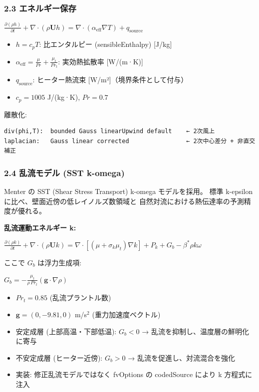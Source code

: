 \documentclass[a4paper,11pt]{article}
\begin{document}
\subsubsection{2.3 エネルギー保存}

$
\frac{\partial (\rho h)}{\partial t}
+ \nabla \cdot (\rho \mathbf{U} h) = \nabla \cdot (\alpha_{\text{eff}} \nabla T) + q_{\text{source}}
$

\begin{itemize} \item $h = c_p T$: 比エンタルピー (sensibleEnthalpy) [J/kg] \end{itemize}
\begin{itemize} \item $\alpha_{\text{eff}} = \frac{\mu}{Pr} + \frac{\mu_t}{Pr_t}$: 実効熱拡散率 [W/(m·K)] \end{itemize}
\begin{itemize} \item $q_{\text{source}}$: ヒーター熱流束 [W/m²]（境界条件として付与） \end{itemize}
\begin{itemize} \item $c_p = 1005$ J/(kg·K), $Pr = 0.7$ \end{itemize}

離散化:

\begin{verbatim}
div(phi,T):  bounded Gauss linearUpwind default    ← 2次風上
laplacian:   Gauss linear corrected                ← 2次中心差分 + 非直交補正
\end{verbatim}

\subsubsection{2.4 乱流モデル (SST k-omega)}

Menter の SST (Shear Stress Transport) k-omega モデルを採用。
標準 k-epsilon に比べ、壁面近傍の低レイノルズ数領域と
自然対流における熱伝達率の予測精度が優れる。

\textbf{乱流運動エネルギー k:}

$
\frac{\partial (\rho k)}{\partial t}
+ \nabla \cdot (\rho \mathbf{U} k)
= \nabla \cdot \left[ (\mu + \sigma_k \mu_t) \nabla k \right]
+ P_k + G_b - \beta^* \rho k \omega
$

ここで $G_b$ は浮力生成項:

$
G_b = -\frac{\mu_t}{\rho \, Pr_t} \left( \mathbf{g} \cdot \nabla \rho \right)
$

\begin{itemize}
\item $Pr_t = 0.85$ (乱流プラントル数)
\item $\mathbf{g} = (0, -9.81, 0)$ m/s$^2$ (重力加速度ベクトル)
\item 安定成層 (上部高温・下部低温): $G_b < 0$ → 乱流を抑制し、温度層の鮮明化に寄与
\item 不安定成層 (ヒーター近傍): $G_b > 0$ → 乱流を促進し、対流混合を強化
\item 実装: 修正乱流モデルではなく fvOptions の codedSource により k 方程式に注入
\end{itemize}
\end{document}

